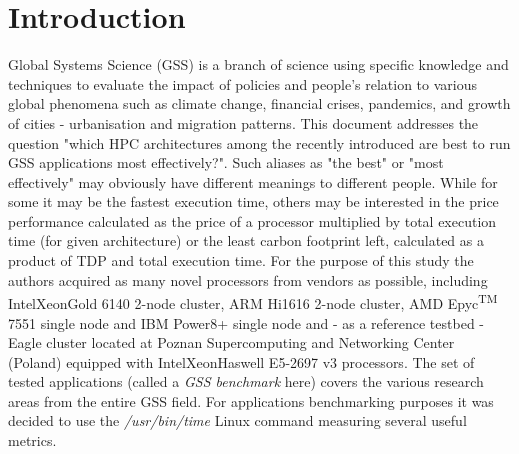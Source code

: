 \section{Introduction}
\label{sec:intro}
Global Systems Science (GSS) is a branch of science using specific knowledge and techniques to evaluate the impact of policies and people's relation to various global phenomena such as climate change, financial crises, pandemics, and growth of cities - urbanisation and migration patterns. This document addresses the question "which HPC architectures among the recently introduced are best to run GSS applications most effectively?". Such aliases as "the best" or "most effectively" may obviously have different meanings to different people. While for some it may be the fastest execution time, others may be interested in the price performance calculated as the price of a processor multiplied by total execution time (for given architecture) or the least carbon footprint left, calculated as a product of TDP  and total execution time.
For the purpose of this study the authors acquired as many novel processors from vendors as possible, including Intel\textregistered Xeon\textregistered Gold 6140 \cite{INTELXEONGOLD6140} 2-node cluster, ARM Hi1616 2-node cluster, AMD Epyc\textsuperscript{TM} 7551 single node and IBM Power8+ \cite{IBMPOWER8} single node and - as a reference testbed - Eagle cluster located at Poznan Supercomputing and Networking Center (Poland) equipped with Intel\textregistered  Xeon\textregistered Haswell E5-2697 v3 processors.
The set of tested applications (called a \textit{GSS benchmark} here) covers the various research areas from the entire GSS field. For applications benchmarking purposes it was decided to use the \textit{/usr/bin/time} Linux command measuring several useful metrics.
